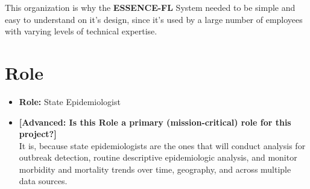 \documentclass{article}
\begin{document}
\begin{itemize}
This organization is why the \textbf{ESSENCE-FL} System needed to be simple and easy to understand on it's design, since it's used by a large number of employees with varying levels of technical expertise.
\end{itemize}

\section{Role}
\begin{itemize}
\item{\textbf{Role:}} State Epidemiologist

\item{\textbf{[Advanced: Is this Role a primary (mission-critical) role for this project?]}}\\
It is, because state epidemiologists are the ones that will conduct analysis for outbreak detection, routine descriptive epidemiologic analysis, and monitor morbidity and mortality trends over time, geography, and across multiple data sources.
\end{itemize}
\pagebreak
\end{document}
